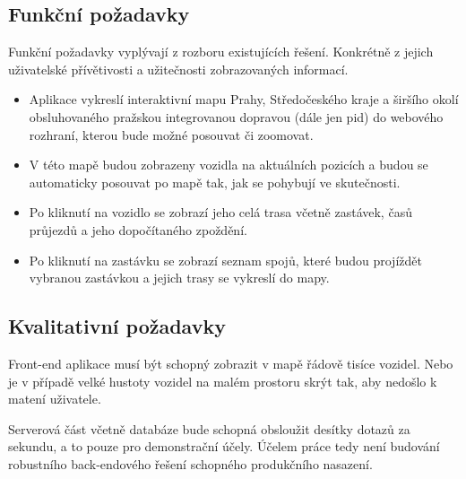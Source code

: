 \subsection{Funkční požadavky}


Funkční požadavky vyplývají z rozboru existujících řešení. Konkrétně z jejich uživatelské přívětivosti a užitečnosti zobrazovaných informací.


\begin{itemize}


\item Aplikace vykreslí interaktivní mapu Prahy, Středočeského kraje a širšího okolí obsluhovaného pražskou integrovanou dopravou (dále jen \gls{pid}) do webového rozhraní, kterou bude možné posouvat či zoomovat.


\item V této mapě budou zobrazeny vozidla na aktuálních pozicích a budou se automaticky posouvat po mapě tak, jak se pohybují ve skutečnosti.


\item Po kliknutí na vozidlo se zobrazí jeho celá trasa včetně zastávek, časů průjezdů a jeho dopočítaného zpoždění.


\item Po kliknutí na zastávku se zobrazí seznam spojů, které budou projíždět vybranou zastávkou a jejich trasy se vykreslí do mapy.


\end{itemize}


\subsection{Kvalitativní požadavky}


Front-end aplikace musí být schopný zobrazit v mapě řádově tisíce vozidel. Nebo je v případě velké hustoty vozidel na malém prostoru skrýt tak, aby nedošlo k matení uživatele.


\bigbreak


Serverová část včetně databáze bude schopná obsloužit desítky dotazů za sekundu, a to pouze pro demonstrační účely. Účelem práce tedy není budování robustního back-endového řešení schopného produkčního nasazení.
